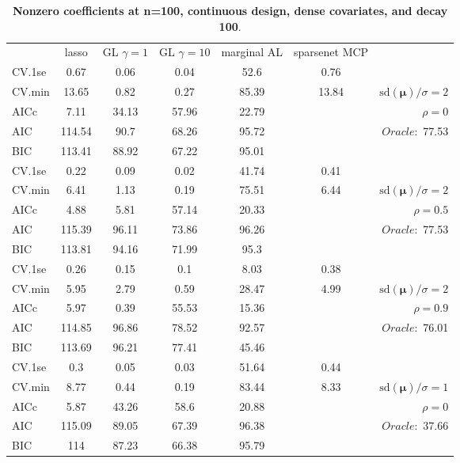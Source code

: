 \begin{table}\vspace{-.5cm}
\caption[l]{ { \bf Nonzero coefficients at n=100, continuous design, 
dense covariates, and  decay  100}.}
\vspace{-.5cm}
\footnotesize{}
\begin{center}
\begin{tabular}{l*{5}{c}|r}
& lasso & GL $\gamma=1$ & GL $\gamma=10$ & marginal AL & sparsenet MCP  & \\
 \cline{1-7}
CV.1se & 0.67 & 0.06 & 0.04 & 52.6 & 0.76 & \\
CV.min & 13.65 & 0.82 & 0.27 & 85.39 & 13.84 &  $\mathrm{sd}(\mathbf{\mu})/\sigma=2$ \\
AICc & 7.11 & 34.13 & 57.96 & 22.79 & & $\rho=0$ \\
AIC & 114.54 & 90.7 & 68.26 & 95.72 & &  \multirow{2}{*}{$Oracle: $ 77.53} \\
BIC & 113.41 & 88.92 & 67.22 & 95.01 & &  \\
 \hline 
CV.1se & 0.22 & 0.09 & 0.02 & 41.74 & 0.41 & \\
CV.min & 6.41 & 1.13 & 0.19 & 75.51 & 6.44 &  $\mathrm{sd}(\mathbf{\mu})/\sigma=2$ \\
AICc & 4.88 & 5.81 & 57.14 & 20.33 & & $\rho=0.5$ \\
AIC & 115.39 & 96.11 & 73.86 & 96.26 & &  \multirow{2}{*}{$Oracle: $ 77.53} \\
BIC & 113.81 & 94.16 & 71.99 & 95.3 & &  \\
 \hline 
CV.1se & 0.26 & 0.15 & 0.1 & 8.03 & 0.38 & \\
CV.min & 5.95 & 2.79 & 0.59 & 28.47 & 4.99 &  $\mathrm{sd}(\mathbf{\mu})/\sigma=2$ \\
AICc & 5.97 & 0.39 & 55.53 & 15.36 & & $\rho=0.9$ \\
AIC & 114.85 & 96.86 & 78.52 & 92.57 & &  \multirow{2}{*}{$Oracle: $ 76.01} \\
BIC & 113.69 & 96.21 & 77.41 & 45.46 & &  \\
 \hline 
CV.1se & 0.3 & 0.05 & 0.03 & 51.64 & 0.44 & \\
CV.min & 8.77 & 0.44 & 0.19 & 83.44 & 8.33 &  $\mathrm{sd}(\mathbf{\mu})/\sigma=1$ \\
AICc & 5.87 & 43.26 & 58.6 & 20.88 & & $\rho=0$ \\
AIC & 115.09 & 89.05 & 67.39 & 96.38 & &  \multirow{2}{*}{$Oracle: $ 37.66} \\
BIC & 114 & 87.23 & 66.38 & 95.79 & &  \\

\end{tabular}
\end{center}
\end{table}
